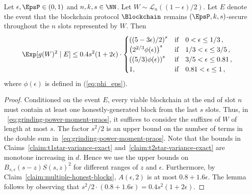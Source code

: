 \begin{lemma}\label{lemma:grinding-praos-second-moment}
  Let $\epsilon, \EpsP \in (0, 1)$ and $n, k, s \in \NN$. 
  Let $W \sim \mathcal{L}_n((1 - \epsilon)/2)$. 
  Let $E$ denote the event that 
  the blockchain protocol $\Blockchain$ 
  remains $(\EpsP, k, s)$-secure throughout 
  the $n$ slots represented by $W$. 
  Then
  \begin{equation}\label{eq:grinding-praos-second-moment}
    \Exp[ g(W)^2 \mid E] 
    \leq 
      0.4 s^2 (1 + 2\epsilon)
      \cdot \begin{cases}
      \left( (5-3 \epsilon)/2 \right)^s & \text{if}\quad 0 < \epsilon \leq 1/3\,, \\
      \left( 2^{2/3} \phi(\epsilon) \right)^s & \text{if}\quad 1/3 < \epsilon \leq 3/5\,, \\
      \left( (5/3) \phi(\epsilon) \right)^s & \text{if}\quad 3/5 < \epsilon \leq 0.81\,, \\
      1,  & \text{if}\quad 0.81 < \epsilon \leq 1\,,
    \end{cases}    
  \end{equation}
  where $\phi(\epsilon)$ is defined in (\ref{eq:phi_eps}).
\end{lemma}
\begin{proof}
  Conditioned on the event $E$, 
  every viable blockchain at the end of slot $n$ 
  must contain at least one honestly-generated block from the last $s$ slots. 
  Thus, 
  in ~\eqref{eq:grinding-power-moment-praos}, 
  it suffices to consider the suffixes of $W$ of length at most $s$. 
  The factor $s^2/2$ is an upper bound on 
  the number of terms in the double sum in~\eqref{eq:grinding-power-moment-praos}. 
  Note that the bounds in 
  Claims~\ref{claim:t1star-variance-exact} 
  and~\ref{claim:t2star-variance-exact} are monotone increasing in $d$. 
  Hence we use the upper bounds on $B_{s, \epsilon}(s-z) S(s,z)^2$ for 
  different ranges of $z$ and $\epsilon$. 
  Furthermore, by Claim~\ref{claim:multiple-honest-blocks}, 
  $A(\epsilon, 2)$ is at most $0.8 + 1.6 \epsilon$. 
  The lemma follows by observing that $s^2/2 \cdot (0.8 + 1.6 \epsilon) = 0.4 s^2 (1 + 2 \epsilon)$.
\end{proof}




